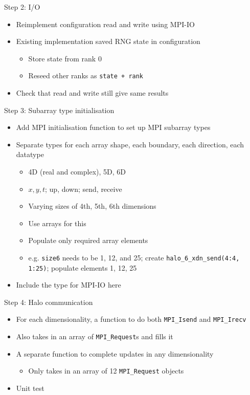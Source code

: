 \documentclass[handout]{beamer}
\begin{document}
\begin{frame}{Step 2: I/O}
	\begin{itemize}[<+->]
		\item Reimplement configuration read and write using MPI-IO
		\item Existing implementation saved RNG state in configuration
		\begin{itemize}[<+->]
			\item Store state from rank 0
			\item Reseed other ranks as \texttt{state + rank}
		\end{itemize}
		\item Check that read and write still give same results
	\end{itemize}
\end{frame}

\begin{frame}[fragile]{Step 3: Subarray type initialisation}
	\begin{itemize}[<+->]
		\item Add MPI initialisation function to set up MPI subarray types
		\item Separate types for each array shape, each boundary, each direction, each datatype
		\begin{itemize}[<+->]
			\item 4D (real and complex), 5D, 6D
			\item $x, y, t$; up, down; send, receive
			\item Varying sizes of 4th, 5th, 6th dimensions
			\item Use arrays for this
			\item Populate only required array elements
			\item e.g. \verb|size6| needs to be 1, 12, and 25; create \verb|halo_6_xdn_send(4:4, 1:25)|; populate elements 1, 12, 25
		\end{itemize}
		\item Include the type for MPI-IO here
	\end{itemize}
\end{frame}

\begin{frame}[fragile]{Step 4: Halo communication}
	\begin{itemize}[<+->]
		\item For each dimensionality, a function to do both \verb|MPI_Isend| and \verb|MPI_Irecv|
		\item Also takes in an array of \verb|MPI_Request|s and fills it
		\item A separate function to complete updates in any dimensionality
		\begin{itemize}[<+->]
			\item Only takes in an array of 12 \verb|MPI_Request| objects
		\end{itemize}
		\item Unit test
	\end{itemize}
\end{frame}
\end{document}
